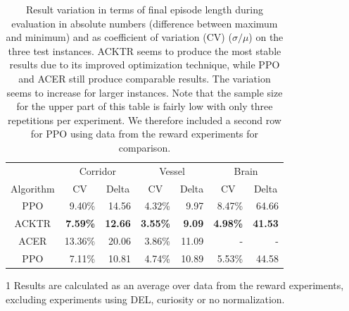 \begin{table}[htp]
    \begin{center}
        \begin{threeparttable}
            \begin{tabular}{crrrrrr}
                \toprule
                 & \multicolumn{2}{c}{Corridor} & \multicolumn{2}{c}{Vessel} & \multicolumn{2}{c}{Brain} \\
                \cmidrule(lr){2-3} \cmidrule(lr){4-5} \cmidrule(lr){6-7}
                \multicolumn{1}{c}{Algorithm} & \multicolumn{1}{c}{CV} & \multicolumn{1}{c}{Delta} & \multicolumn{1}{c}{CV} & \multicolumn{1}{c}{Delta} & \multicolumn{1}{c}{CV} & \multicolumn{1}{c}{Delta} \\
                \midrule
                PPO & 9.40\% & 14.56 & 4.32\% & 9.97 & 8.47\% & 64.66\\
                ACKTR & \textbf{7.59\%} & \textbf{12.66} & \textbf{3.55\%} & \textbf{9.09} & \textbf{4.98\%} & \textbf{41.53} \\
                ACER & 13.36\% & 20.06 & 3.86\% & 11.09 & - & - \\
                \midrule
                PPO\tnote{1} & 7.11\% & 10.81 & 4.74\% & 10.89 & 5.53\% & 44.58 \\
                \bottomrule
            \end{tabular}
            \begin{tablenotes}
                \footnotesize
                \item[1] Results are calculated as an average over data from the reward experiments, excluding experiments using DEL, curiosity or no normalization.
            \end{tablenotes}

        \end{threeparttable}
        
    \end{center}
    \caption[Result Variation Using Different RL Algorithms]{Result variation in terms of final episode length during evaluation in absolute numbers (difference between maximum and minimum) and as coefficient of variation (CV) ($\sigma / \mu$) on the three test instances. ACKTR seems to produce the most stable results due to its improved optimization technique, while PPO and ACER still produce comparable results. The variation seems to increase for larger instances. Note that the sample size for the upper part of this table is fairly low with only three repetitions per experiment. We therefore included a second row for PPO using data from the reward experiments for comparison.} \label{tab:Algorithm/ResultVariation}
\end{table}


